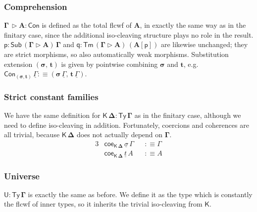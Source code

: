 \documentclass[12pt,a4paper,twoside,openany]{book}
\theoremstyle{remark}
\theoremstyle{definition}
\theoremstyle{theorem}
\newcommand{\bs}[1]{\boldsymbol{#1}}
\newcommand{\Con}{\mathsf{Con}}
\newcommand{\Sub}{\mathsf{Sub}}
\newcommand{\Tm}{\mathsf{Tm}}
\newcommand{\Ty}{\mathsf{Ty}}
\newcommand{\U}{\mathsf{U}}
\newcommand{\ext}{\triangleright}
\newcommand{\p}{\mathsf{p}}
\newcommand{\q}{\mathsf{q}}
\newcommand{\K}{\mathsf{K}}
\newcommand{\bTy}{\bs{\Ty}}
\newcommand{\bGamma}{\bs{\Gamma}}
\newcommand{\bDelta}{\bs{\Delta}}
\newcommand{\bsigma}{\bs{\sigma}}
\newcommand{\bt}{\bs{t}}
\newcommand{\bA}{\bs{A}}
\newcommand{\bU}{\bs{\U}}
\newcommand{\bK}{\bs{\mathsf{K}}}
\newcommand{\ul}[1]{\underline{#1}}
\newcommand{\ulGamma}{\ul{\Gamma}}
\newcommand{\ulsigma}{\ul{\sigma}}
\newcommand{\ult}{\ul{t}}
\newcommand{\coe}{\mathsf{coe}}
\newcommand{\defn}{:\equiv}
\begin{document}
\subsubsection{Comprehension}

$\bs{\Gamma\,\ext A : \Con}$ is defined as the total flcwf of $\bA$, in exactly
the same way as in the finitary case, since the additional iso-cleaving
structure plays no role in the result. $\bs{\p : \Sub\,(\Gamma\ext A)\,\Gamma}$
and $\bs{\q : \Tm\,(\Gamma\ext A)\,(A[\p])}$ are likewise unchanged; they are
strict morphisms, so also automatically weak morphisms. Substitution extension
$\bs{(\sigma,\,t)}$ is given by pointwise combining $\bsigma$ and $\bt$,
e.g.\ $\Con_{\bs{(\sigma,t)}}\,\ulGamma \defn (\bsigma\,\ulGamma,\,\bt\,\ulGamma)$.

\subsubsection{Strict constant families}
We have the same definition for $\bs{\K\,\Delta : \Ty\,\Gamma}$ as in the
finitary case, although we need to define iso-cleaving in addition. Fortunately,
coercions and coherences are all trivial, because $\bK\,\bDelta$ does not actually
depend on $\bGamma$.
\begin{alignat*}{3}
  &\coe_{\bs{\K\,\Delta}}\,\ulsigma\,\Gamma &&\defn \Gamma\\
  &\coe_{\bs{\K\,\Delta}}\,\ult\,A          &&\defn A
\end{alignat*}

\subsubsection{Universe}

$\bU : \bTy\,\bGamma$ is exactly the same as before. We define it as the type
which is constantly the flcwf of inner types, so it inherits the trivial
iso-cleaving from $\bK$.
\end{document}
